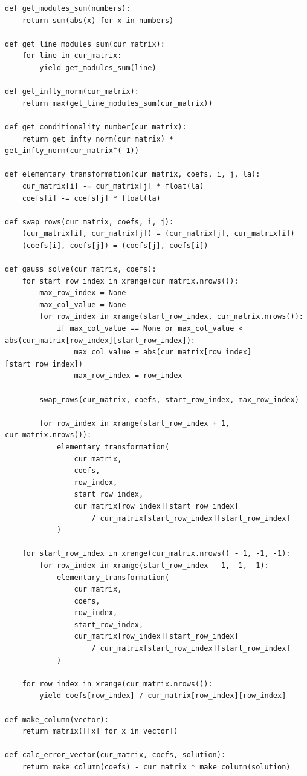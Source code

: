 \documentclass{article}
\theoremstyle{definition}
\theoremstyle{remark}
\begin{document}
\begin{lstlisting}
def get_modules_sum(numbers):
	return sum(abs(x) for x in numbers)

def get_line_modules_sum(cur_matrix):
	for line in cur_matrix:
		yield get_modules_sum(line)

def get_infty_norm(cur_matrix):
	return max(get_line_modules_sum(cur_matrix))

def get_conditionality_number(cur_matrix):
	return get_infty_norm(cur_matrix) * get_infty_norm(cur_matrix^(-1))

def elementary_transformation(cur_matrix, coefs, i, j, la):
	cur_matrix[i] -= cur_matrix[j] * float(la)
	coefs[i] -= coefs[j] * float(la)

def swap_rows(cur_matrix, coefs, i, j):
	(cur_matrix[i], cur_matrix[j]) = (cur_matrix[j], cur_matrix[i])
	(coefs[i], coefs[j]) = (coefs[j], coefs[i])

def gauss_solve(cur_matrix, coefs):
	for start_row_index in xrange(cur_matrix.nrows()):
		max_row_index = None
		max_col_value = None
		for row_index in xrange(start_row_index, cur_matrix.nrows()):
			if max_col_value == None or max_col_value < abs(cur_matrix[row_index][start_row_index]):
				max_col_value = abs(cur_matrix[row_index][start_row_index])
				max_row_index = row_index

		swap_rows(cur_matrix, coefs, start_row_index, max_row_index)

		for row_index in xrange(start_row_index + 1, cur_matrix.nrows()):
			elementary_transformation(
				cur_matrix,
				coefs,
				row_index,
				start_row_index,
				cur_matrix[row_index][start_row_index]
					/ cur_matrix[start_row_index][start_row_index]
			)

	for start_row_index in xrange(cur_matrix.nrows() - 1, -1, -1):
		for row_index in xrange(start_row_index - 1, -1, -1):
			elementary_transformation(
				cur_matrix,
				coefs,
				row_index,
				start_row_index,
				cur_matrix[row_index][start_row_index]
					/ cur_matrix[start_row_index][start_row_index]
			)

	for row_index in xrange(cur_matrix.nrows()):
		yield coefs[row_index] / cur_matrix[row_index][row_index]

def make_column(vector):
	return matrix([[x] for x in vector])

def calc_error_vector(cur_matrix, coefs, solution):
	return make_column(coefs) - cur_matrix * make_column(solution)


\end{lstlisting}
\end{document}
